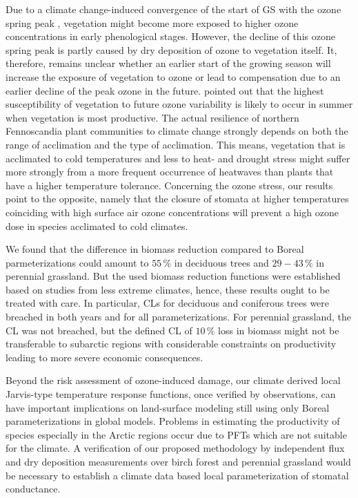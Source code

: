 \documentclass[bg, manuscript]{copernicus}
\begin{document}
Due to a climate change-induced convergence of the start of GS with the ozone spring peak \citep{EP:Karlsson2007}, vegetation might become more exposed to higher ozone concentrations in early phenological stages. However, the decline of this ozone spring peak is partly caused by dry deposition of ozone to vegetation itself. It, therefore, remains unclear whether an earlier start of the growing season will increase the exposure of vegetation to ozone or lead to compensation due to an earlier decline of the peak ozone in the future. \citet{ESPR:Hayes2021} pointed out that the highest susceptibility of vegetation to future ozone variability is likely to occur in summer when vegetation is most productive. The actual resilience of northern Fennoscandia plant communities to climate change strongly depends on both the range of acclimation and the type of acclimation. This means, vegetation that is acclimated to cold temperatures and less to heat- and drought stress might suffer more strongly from a more frequent occurrence of heatwaves than plants that have a higher temperature tolerance. Concerning the ozone stress, our results point to the opposite, namely that the closure of stomata at higher temperatures coinciding with high surface air ozone concentrations will prevent a high ozone dose in species acclimated to cold climates.

We found that the difference in biomass reduction compared to Boreal parmeterizations \citep{ICP:MappingManual2017} could amount to $55\,\unit{\%}$ in deciduous trees and $29-43\,\unit{\%}$ in perennial grassland. But the used biomass reduction functions were established based on studies from less extreme climates, hence, these results ought to be treated with care. In particular, CLs for deciduous and coniferous trees were breached in both years and for all parameterizations. For perennial grassland, the CL was not breached, but the defined CL of $10\,\unit{\%}$ loss in biomass might not be transferable to subarctic regions with considerable constraints on productivity leading to more severe economic consequences.

Beyond the risk assessment of ozone-induced damage, our climate derived local Jarvis-type temperature response functions, once verified by observations, can have important implications on land-surface modeling still using only Boreal parameterizations in global models. Problems in estimating the productivity of species especially in the Arctic regions occur due to PFTs which are not suitable for the climate. A verification of our proposed methodology by independent flux and dry deposition measurements over birch forest and perennial grassland would be necessary to establish a climate data based local parameterization of stomatal conductance.
\end{document}
